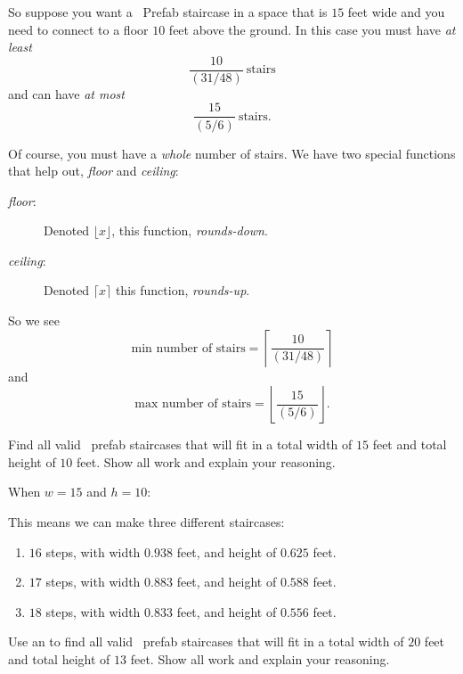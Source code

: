 \documentclass[noauthor,nooutcomes,handout]{ximera}
\begin{document}
So suppose you want a \mooculus~Prefab staircase in a space that is
$15$ feet wide and you need to connect to a floor $10$ feet above the
ground. In this case you must have \emph{at least}
\[
\frac{10}{\left(31/48\right)} \ \text{stairs}
\]
and can have \emph{at most}
\[
\frac{15}{\left(5/6\right)} \ \text{stairs}.
\]


Of course, you must have a \emph{whole} number of stairs. We have two special functions that help out, \emph{floor} and \emph{ceiling}:
\begin{description}
\item[\emph{floor}:] Denoted $\lfloor x\rfloor$, this function, \emph{rounds-down}.
\item[\emph{ceiling}:] Denoted $\lceil x\rceil$ this function, \emph{rounds-up}.
\end{description}
So we see
\[
\text{min number of stairs} = \left\lceil \frac{10}{\left(31/48\right)} \right\rceil
\]
and
\[
\text{max number of stairs} = \left\lfloor \frac{15}{\left(5/6\right)} \right\rfloor.
\]


\mynewpage


\begin{question}
  Find all valid \mooculus~prefab staircases that will fit in a total
  width of $15$ feet and total height of $10$ feet. Show all work and
  explain your reasoning.
  \begin{freeResponse}
  When $w=15$ and $h=10$:
  
  This means we can make three different staircases:
  \begin{enumerate}
  \item $16$ steps, with width $0.938$ feet, and height of $0.625$ feet.
  \item $17$ steps, with width $0.883$ feet, and height of $0.588$ feet.
  \item $18$ steps, with width $0.833$ feet, and height of $0.556$ feet.
  \end{enumerate}
  \end{freeResponse}
\end{question}


\mynewpage

\begin{question}
  Use an  to
  find all valid \mooculus~prefab staircases that will fit in a total
  width of $20$ feet and total height of $13$ feet. Show all work and
  explain your reasoning.

  \begin{freeResponse}
  \end{freeResponse}
\end{question}
\mynewpage
\end{document}
